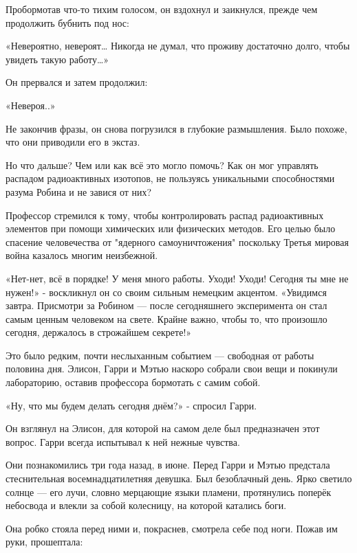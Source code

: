 \documentclass[a4paper,12pt]{book}
\begin{document}
\par
Пробормотав что-то тихим голосом, он вздохнул и заикнулся, прежде чем продолжить бубнить под нос:
\par
«Невероятно, невероят… Никогда не думал, что проживу достаточно долго, чтобы увидеть такую работу…»
\par
Он прервался и затем продолжил:
\par
«Невероя..»
\par
Не закончив фразы, он снова погрузился в глубокие размышления. Было похоже, что они приводили его в экстаз.
\par
Но что дальше? Чем или как всё это могло помочь? Как он мог управлять распадом радиоактивных изотопов, не пользуясь уникальными способностями разума Робина и не завися от них?
\par
Профессор стремился к тому, чтобы контролировать распад радиоактивных элементов при помощи химических или физических методов. Его целью было спасение человечества от "ядерного самоуничтожения" поскольку Третья мировая война казалось многим неизбежной.\\
\par
«Нет-нет, всё в порядке! У меня много работы. Уходи! Уходи! Сегодня ты мне не нужен!» - воскликнул он со своим сильным немецким акцентом.
\newline\hspace*{0.4cm}
«Увидимся завтра. Присмотри за Робином — после сегодняшнего эксперимента он стал самым ценным человеком на свете. Крайне важно, чтобы то, что произошло сегодня, держалось в строжайшем секрете!»
\par
Это было редким, почти неслыханным событием — свободная от работы половина дня. Элисон, Гарри и Мэтью наскоро собрали свои вещи и покинули лабораторию, оставив профессора бормотать с самим собой.\\
\par
«Ну, что мы будем делать сегодня днём?» - спросил Гарри.
\par
Он взглянул на Элисон, для которой на самом деле был предназначен этот вопрос. Гарри всегда испытывал к ней нежные чувства.
\par
Они познакомились три года назад, в июне. Перед Гарри и Мэтью предстала стеснительная восемнадцатилетняя девушка. Был безоблачный день. Ярко светило солнце — его лучи, словно мерцающие языки пламени, протянулись поперёк небосвода и влекли за собой колесницу, на которой катались боги.
\par
Она робко стояла перед ними и, покраснев, смотрела себе под ноги. Пожав им руки, прошептала:
\end{document}
